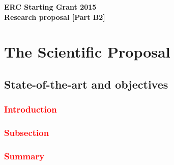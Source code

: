 




\addtocounter{chapter}{1}

\begin{center}
\LARGE{\textbf{ERC Starting Grant 2015\\
Research proposal [Part B2] }
}
\end{center}
\vspace{1cm}

\chapter{The Scientific Proposal}


\section{State-of-the-art and objectives}\label{sec:stateofart}

\subsection*{\textcolor{red}{Introduction}}\label{sec:stateofart:intro}
\textcolor{red}{\blindtext[5]}


\subsection*{\textcolor{red}{Subsection}}\label{sec:stateofart:subsection}
\textcolor{red}{\blindtext[2]}

\textcolor{red}{\blindtext[2]}


\subsection*{\textcolor{red}{Summary}}\label{sec:stateofart:summary}
\textcolor{red}{\blindtext[5]}


